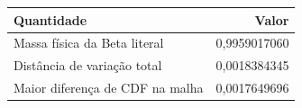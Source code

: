 \begin{tabular}{lr}
\toprule
Quantidade & Valor \\
\midrule
Massa física da Beta literal & 0,9959017060 \\
Distância de variação total & 0,0018384345 \\
Maior diferença de CDF na malha & 0,0017649696 \\
\bottomrule
\end{tabular}
